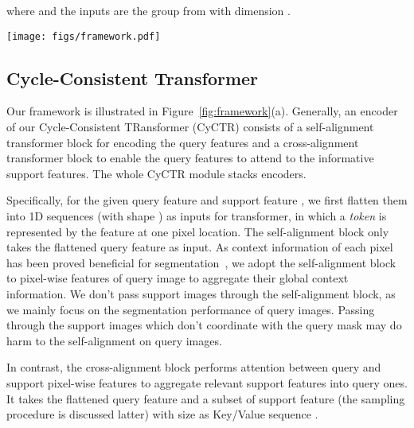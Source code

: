 \documentclass{article}
\begin{document}
where  and the inputs  are the  group from  with dimension .


\begin{figure*}[t]
    \centering
    \texttt{[image: figs/framework.pdf]}
    \caption{Framework of our proposed Cycle-Consistent TRansformer (CyCTR). Each encoder of CyCTR consists of two transformers blocks, \emph{i.e.}, the self-alignment block for utilizing global context within the query feature map and 
    the cross-alignment block for aggregate information from support images. In the cross-alignment block, we introduce the multi-head cycle-consistent attention (shown on the right, with the number of heads  for simplicity). The attention operation is guided by the cycle-consistency among query and support features.}
    \label{fig:framework}
\end{figure*}

\subsection{Cycle-Consistent Transformer}
Our framework is illustrated in Figure~\ref{fig:framework}(a). Generally, an encoder of our Cycle-Consistent TRansformer (CyCTR) consists of a self-alignment transformer block for encoding the query features and a cross-alignment transformer block to enable the query features to attend to the informative support features. The whole CyCTR module stacks  encoders. 

Specifically, for the given query feature  and support feature , we first flatten them into 1D sequences (with shape ) as inputs for transformer, in which a \textit{token} is represented by the feature  at one pixel location. The self-alignment block only takes the flattened query feature as input.
As context information of each pixel has been proved beneficial for segmentation~\cite{chen2017deeplab,pspnet}, 
we adopt the self-alignment block to pixel-wise features of query image to aggregate their global context information. 
We don't pass support images through the self-alignment block, as we mainly focus on the segmentation performance of query images. 
Passing through the support images which don't coordinate with the query mask may do harm to the self-alignment on query images.

In contrast, the cross-alignment block performs attention between query and support pixel-wise features to 
aggregate relevant support features into query ones. It takes the flattened query feature and a subset of support feature (the sampling procedure is discussed latter) with size  as Key/Value sequence . 
\end{document}
